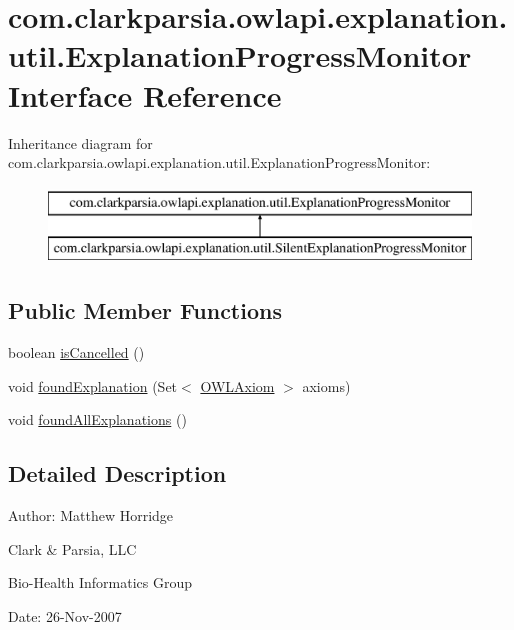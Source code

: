 \hypertarget{interfacecom_1_1clarkparsia_1_1owlapi_1_1explanation_1_1util_1_1_explanation_progress_monitor}{\section{com.\-clarkparsia.\-owlapi.\-explanation.\-util.\-Explanation\-Progress\-Monitor Interface Reference}
\label{interfacecom_1_1clarkparsia_1_1owlapi_1_1explanation_1_1util_1_1_explanation_progress_monitor}
}
Inheritance diagram for com.\-clarkparsia.\-owlapi.\-explanation.\-util.\-Explanation\-Progress\-Monitor\-:\begin{figure}[H]
\begin{center}
\leavevmode
\includegraphics[height=2.000000cm]{interfacecom_1_1clarkparsia_1_1owlapi_1_1explanation_1_1util_1_1_explanation_progress_monitor}
\end{center}
\end{figure}
\subsection*{Public Member Functions}
\begin{DoxyCompactItemize}
\item 
boolean \hyperlink{interfacecom_1_1clarkparsia_1_1owlapi_1_1explanation_1_1util_1_1_explanation_progress_monitor_ace6c22e30f5c3950c94ae7f78d6f1c9a}{is\-Cancelled} ()
\item 
void \hyperlink{interfacecom_1_1clarkparsia_1_1owlapi_1_1explanation_1_1util_1_1_explanation_progress_monitor_ac8d3e80be785902b37902091d446e8f3}{found\-Explanation} (Set$<$ \hyperlink{interfaceorg_1_1semanticweb_1_1owlapi_1_1model_1_1_o_w_l_axiom}{O\-W\-L\-Axiom} $>$ axioms)
\item 
void \hyperlink{interfacecom_1_1clarkparsia_1_1owlapi_1_1explanation_1_1util_1_1_explanation_progress_monitor_ae08a6ceb9ff0964932e4b9ec2156e8b2}{found\-All\-Explanations} ()
\end{DoxyCompactItemize}


\subsection{Detailed Description}
Author\-: Matthew Horridge\par
 Clark \& Parsia, L\-L\-C\par
 Bio-\/\-Health Informatics Group\par
 Date\-: 26-\/\-Nov-\/2007\par
\par


